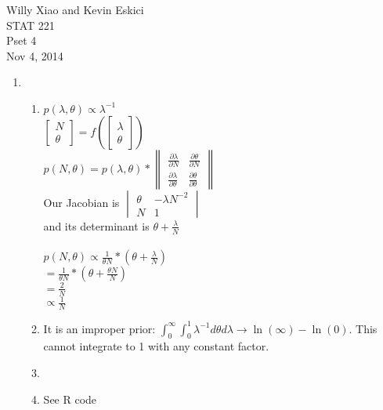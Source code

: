\documentclass[paper=a4, fontsize=11pt]{scrartcl}
\newcommand{\parens}[1]{ \left( #1 \right) }
\begin{document}
\noindent Willy Xiao and Kevin Eskici \\ STAT 221 \\Pset 4\\ Nov 4, 2014
\begin{enumerate}
  \item
    \begin{enumerate}[1]
      
      \item   
      $p(\lambda, \theta) \propto \lambda^{-1}$\\
      $\begin{bmatrix} N \\ \theta \end{bmatrix} = f\parens{\begin{bmatrix} \lambda \\ \theta \end{bmatrix}}$\\
      $p(N, \theta) = p(\lambda, \theta) * \begin{Vmatrix}  \frac{\partial \lambda}{\partial N} &  \frac{\partial \theta}{\partial N} \\ \frac{\partial \lambda}{\partial \theta} &  \frac{\partial \theta}{\partial \theta} \end{Vmatrix}$\\
      Our Jacobian is $\begin{vmatrix} \theta & {-\lambda N^{-2}} \\N & 1 \end{vmatrix}$\\
      and its determinant is $\theta + \frac{\lambda}{N}$\\\\
      $p(N, \theta) \propto \frac{1}{\theta N} * (\theta + \frac{\lambda}{N})$\\
      $= \frac{1}{\theta N} * (\theta + \frac{\theta N}{N})$\\
      $= \frac{2}{N}$\\
      $\propto \frac{1}{N}$



      \item It is an improper prior: $\int_0^\infty{\int_0^1{\lambda^{-1}}}d\theta d\lambda \rightarrow \ln(\infty) - \ln(0)$. This cannot integrate to 1 with any constant factor.
	
	\item   
	
	\item See R code
	

\end{enumerate}
\end{enumerate}
\end{document}
